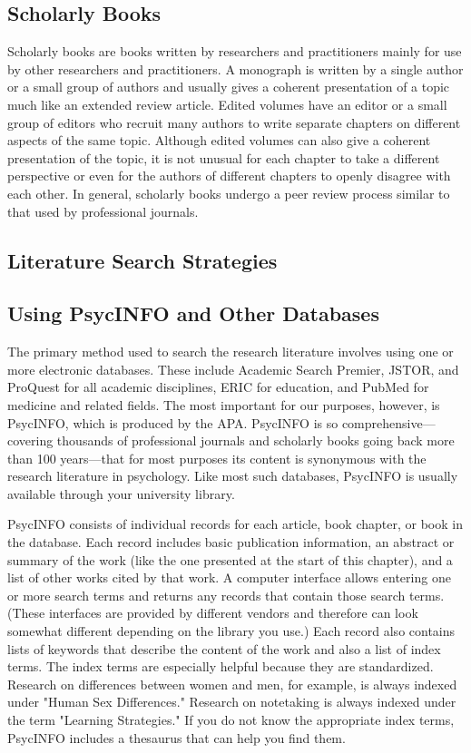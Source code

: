 \subsection{Scholarly Books}
Scholarly books are books written by researchers and practitioners mainly for use by other researchers and practitioners. A monograph is written by a single author or a small group of authors and usually gives a coherent presentation of a topic much like an extended review article. Edited volumes have an editor or a small group of editors who recruit many authors to write separate chapters on different aspects of the same topic. Although edited volumes can also give a coherent presentation of the topic, it is not unusual for each chapter to take a different perspective or even for the authors of different chapters to openly disagree with each other. In general, scholarly books undergo a peer review process similar to that used by professional journals.

\subsection{Literature Search Strategies}
\subsection{Using PsycINFO and Other Databases}
The primary method used to search the research literature involves using one or more electronic databases. These include Academic Search Premier, JSTOR, and ProQuest for all academic disciplines, ERIC for education, and PubMed for medicine and related fields. The most important for our purposes, however, is PsycINFO, which is produced by the APA. PsycINFO is so comprehensive---covering thousands of professional journals and scholarly books going back more than 100 years---that for most purposes its content is synonymous with the research literature in psychology. Like most such databases, PsycINFO is usually available through your university library.

PsycINFO consists of individual records for each article, book chapter, or book in the database. Each record includes basic publication information, an abstract or summary of the work (like the one presented at the start of this chapter), and a list of other works cited by that work. A computer interface allows entering one or more search terms and returns any records that contain those search terms. (These interfaces are provided by different vendors and therefore can look somewhat different depending on the library you use.) Each record also contains lists of keywords that describe the content of the work and also a list of index terms. The index terms are especially helpful because they are standardized. Research on differences between women and men, for example, is always indexed under "Human Sex Differences." Research on notetaking is always indexed under the term "Learning Strategies." If you do not know the appropriate index terms, PsycINFO includes a thesaurus that can help you find them.

